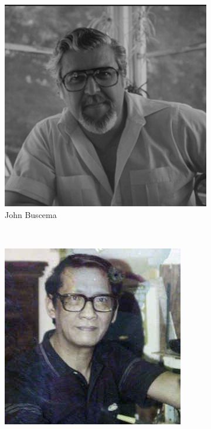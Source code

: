 \begin{frame}{}
\begin{figure}[htp]
 \centering
 \begin{subfigure}[b]{0.16\textwidth}
   \includegraphics[width=\textwidth]{img/artistas/JohnBuscema}
   \caption{John Buscema}
 \end{subfigure}
~
 \begin{subfigure}[b]{0.16\textwidth}
   \includegraphics[width=\textwidth]{img/artistas/AlfredoAlcala}

\end{subfigure}
\end{figure}
\end{frame}

